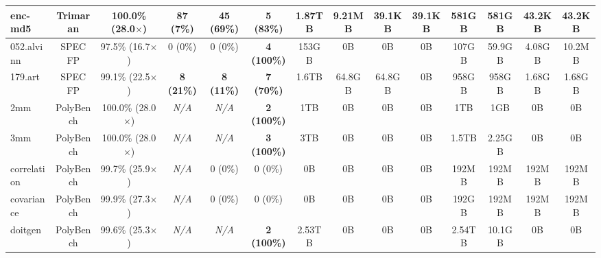 {\begin{tabular}{|l|c|c||c|c||c||c|c|c|c||c|c|c|c|}
\hline
enc-md5    & Trimaran & 100.0\% (28.0$\times$) & \textbf{87 (7\%)} & \textbf{45 (69\%)} & \textbf{5 (83\%)} &
           1.87TB & 9.21MB & 39.1KB & 39.1KB & 581GB & 581GB & 43.2KB & 43.2KB \\ %
\hline
052.alvinn & SPEC FP  & 97.5\% (16.7$\times$) & 0 (0\%) & 0 (0\%) & \textbf{4 (100\%)} &
           153GB & 0B & 0B & 0B & 107GB & 59.9GB & 4.08GB & 10.2MB \\  %
\hline
179.art    & SPEC FP  & 99.1\% (22.5$\times$) & \textbf{8 (21\%)} & \textbf{8 (11\%)} & \textbf{7 (70\%)} &
           1.6TB & 64.8GB & 64.8GB & 0B & 958GB & 958GB & 1.68GB & 1.68GB \\ %
\hline
2mm        & PolyBench & 100.0\% (28.0$\times$)  & \textit{N/A} & \textit{N/A} & \textbf{2 (100\%)} &
           1TB & 0B & 0B & 0B & 1TB & 1GB & 0B & 0B \\ %
\hline
3mm        & PolyBench & 100.0\% (28.0$\times$)  & \textit{N/A} & \textit{N/A} & \textbf{3 (100\%)} &
           3TB & 0B & 0B & 0B & 1.5TB & 2.25GB & 0B & 0B \\ %
\hline
correlation & PolyBench & 99.7\% (25.9$\times$) & \textit{N/A} & 0 (0\%)  & 0 (0\%) &
            0B & 0B & 0B & 0B & 192MB & 192MB & 192MB & 192MB \\ %
\hline
covariance & PolyBench & 99.9\% (27.3$\times$) & \textit{N/A} & 0 (0\%) & 0 (0\%) &
           0B & 0B & 0B & 0B & 192GB & 192MB & 192MB & 192MB \\ %
\hline
doitgen   & PolyBench & 99.6\% (25.3$\times$) & \textit{N/A} & \textit{N/A} & \textbf{2 (100\%)} &
          2.53TB & 0B & 0B & 0B & 2.54TB & 10.1GB & 0B & 0B \\ %

\end{tabular}}
